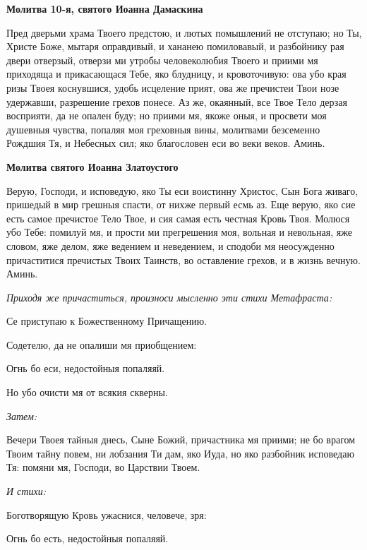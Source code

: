 \medskip
\bfseries Молитва 10-я, святого Иоанна Дамаскина\normalfont{}\nopagebreak


Пред дверьми храма Твоего предстою, и лютых помышлений не отступаю; но Ты, Христе Боже, мытаря оправдивый, и хананею помиловавый, и разбойнику рая двери отверзый, отверзи ми утробы человеколюбия Твоего и приими мя приходяща и прикасающася Тебе, яко блудницу, и кровоточивую: ова убо края ризы Твоея коснувшися, удобь исцеление прият, ова же пречистеи Твои нозе удержавши, разрешение грехов понесе. Аз же, окаянный, все Твое Тело дерзая восприяти, да не опален буду; но приими мя, якоже оныя, и просвети моя душевныя чувства, попаляя моя греховныя вины, молитвами безсеменно Рождшия Тя, и Небесных сил; яко благословен еси во веки веков. Аминь.




\medskip
\bfseries Молитва святого Иоанна Златоустого\normalfont{}\nopagebreak


Верую, Господи, и исповедую, яко Ты еси воистинну Христос, Сын Бога живаго, пришедый в мир грешныя спасти, от нихже первый есмь аз. Еще верую, яко сие есть самое пречистое Тело Твое, и сия самая есть честная Кровь Твоя. Молюся убо Тебе: помилуй мя, и прости ми прегрешения моя, вольная и невольная, яже словом, яже делом, яже ведением и неведением, и сподоби мя неосужденно причаститися пречистых Твоих Таинств, во оставление грехов, и в жизнь вечную. Аминь.


\medskip


\itshape Приходя же причаститься, произноси мысленно эти стихи Метафраста:\normalfont{}


  Се приступаю к Божественному Причащению.


  Содетелю, да не опалиши мя приобщением:


  Огнь бо еси, недостойныя попаляяй.


  Но убо очисти мя от всякия скверны.





\itshape Затем:\normalfont{}


  Вечери Твоея тайныя днесь, Сыне Божий, причастника мя приими; не бо врагом Твоим тайну повем, ни лобзания Ти дам, яко Иуда, но яко разбойник исповедаю Тя: помяни мя, Господи, во Царствии Твоем.


\medskip
\itshape И стихи:\normalfont{}


  Боготворящую Кровь ужаснися, человече, зря:


  Огнь бо есть, недостойныя попаляяй.


